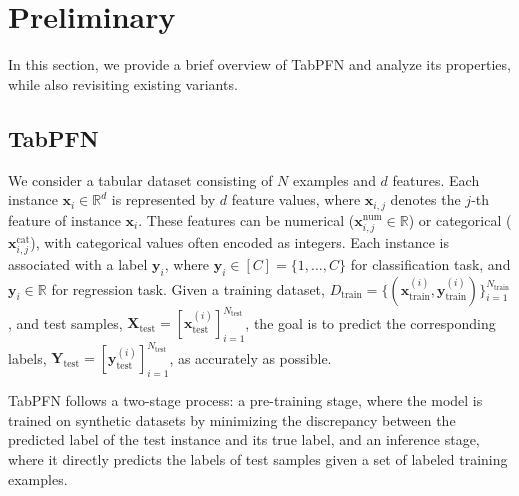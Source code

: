 \section{Preliminary}
\label{sec:preliminary}

In this section, we provide a brief overview of TabPFN and analyze its properties, while also revisiting existing variants.

\subsection{TabPFN}
We consider a tabular dataset consisting of $N$ examples and $d$ features. Each instance $\boldsymbol{x}_i \in \mathbb{R}^d$ is represented by $d$ feature values, where $\boldsymbol{x}_{i,j}$ denotes the $j$-th feature of instance $\boldsymbol{x}_i$. These features can be numerical ($\boldsymbol{x}_{i,j}^{\text{num}} \in \mathbb{R}$) or categorical ($\boldsymbol{x}_{i,j}^{\text{cat}}$), with categorical values often encoded as integers. Each instance is associated with a label $\boldsymbol{y}_i$, where $\boldsymbol{y}_i \in [C] = \{1, \dots, C\}$ for classification task, and $\boldsymbol{y}_i \in \mathbb{R}$ for regression task. Given a training dataset, $D_{\text{train}} = \{(\boldsymbol{x}_{\text{train}}^{(i)}, \boldsymbol{y}_{\text{train}}^{(i)})\}_{i=1}^{N_{\text{train}}}$, and test samples, $\boldsymbol{X}_{\text{test}} = [\boldsymbol{x}_{\text{test}}^{(i)}]_{i=1}^{N_{\text{test}}}$, the goal is to predict the corresponding labels, $\boldsymbol{Y}_{\text{test}} = [\boldsymbol{y}_{\text{test}}^{(i)}]_{i=1}^{N_{\text{test}}}$, as accurately as possible.

TabPFN follows a two-stage process: a pre-training stage, where the model is trained on synthetic datasets by minimizing the discrepancy between the predicted label of the test instance and its true label, and an inference stage, where it directly predicts the labels of test samples given a set of labeled training examples.


